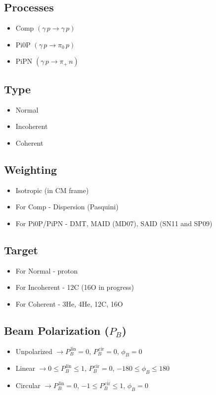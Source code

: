 \documentclass[twoside,letterpaper,12pt]{article}
\begin{document}
\subsection{Processes}
\begin{itemize}
\item Comp $\left(\gamma\,p\rightarrow\gamma\,p\right)$
\item Pi0P $\left(\gamma\,p\rightarrow\pi_{0}\,p\right)$
\item PiPN $\left(\gamma\,p\rightarrow\pi_{+}\,n\right)$
\end{itemize}

\subsection{Type}
\begin{itemize}
\item Normal
\item Incoherent
\item Coherent
\end{itemize}

\subsection{Weighting}
\begin{itemize}
\item Isotropic (in CM frame)
\item For Comp - Dispersion (Pasquini)
\item For Pi0P/PiPN - DMT, MAID (MD07), SAID (SN11 and SP09)
\end{itemize}

\subsection{Target}
\begin{itemize}
\item For Normal - proton
\item For Incoherent - 12C (16O in progress)
\item For Coherent - 3He, 4He, 12C, 16O
\end{itemize}

\subsection{Beam Polarization ($P_{B}$)}
\begin{itemize}
\item  Unpolarized $\rightarrow P_{B}^{\,\mathrm{lin}}=0$, $P_{B}^{\,\mathrm{cir}}=0$, $\phi_{B}=0$
\item Linear $\rightarrow 0\leq P_{B}^{\,\mathrm{lin}}\leq 1$, $P_{B}^{\,\mathrm{cir}}=0$, $-180\leq \phi_{B}\leq 180$
\item Circular $\rightarrow P_{B}^{\,\mathrm{lin}}=0$, $-1\leq P_{B}^{\,\mathrm{cir}}\leq 1$, $\phi_{B}=0$
\end{itemize}
\end{document}

